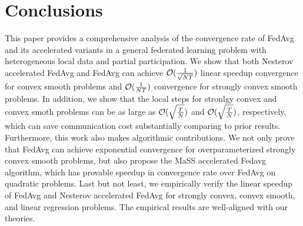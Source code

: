 
\section{Conclusions}
This paper provides a comprehensive analysis of the convergence rate of FedAvg
and its accelerated variants in a general federated learning problem with heterogeneous local data and partial participation. We show that both Nesterov accelerated FedAvg and FedAvg
can achieve {\small{${\mathcal{O}}(\frac{1}{\sqrt{NT}})$}} linear speedup convergence for convex smooth problems and {\small{${\mathcal{O}}(\frac{1}{NT})$}} convergence for strongly 
convex smooth problems. In addition, we show that the local steps for stronlgy convex and convex smoth problems can be as large as {\small{${\mathcal{O}}(\sqrt{\frac{T}{N}})$}} and 
{\small{${\mathcal{O}}(\sqrt{\frac{T}{N}})$}}, respectively, which can save communication cost substantially comparing to prior results. 
Furthermore, this work also makes algorithmic contributions. We not only prove that FedAvg can achieve exponential convergence for overparameterized strongly convex smooth problems, but also propose the MaSS accelerated Fedavg algorithm, which has provable speedup in convergence rate over FedAvg on quadratic problems. Last but not least, we empirically
verify the linear speedup of FedAvg and Nesterov accelerated FedAvg for strongly convex, convex smooth, and linear regression problems. The empirical results are well-aligned with our theories. 